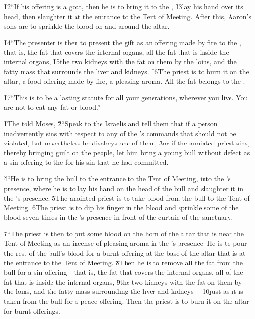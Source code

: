 \v{12}``If his offering is a goat, then he is to bring it to the , \v{13}lay his hand over its head, then slaughter it at the entrance to the Tent of Meeting. After this, Aaron's sons are to sprinkle the blood on and around the altar.

\v{14}``The presenter is then to present the gift as an offering made by fire to the , that is, the fat that covers the internal organs, all the fat that is inside the internal organs, \v{15}the two kidneys with the fat on them by the loins, and the fatty mass that surrounds the liver and kidneys. \v{16}The priest is to burn it on the altar, a food offering made by fire, a pleasing aroma. All the fat belongs to the .

\v{17}``This is to be a lasting statute for all your generations, wherever you live. You are not to eat any fat or blood.''

\v{1}The  told Moses, \v{2}``Speak to the Israelis and tell them that if a person inadvertently sins with respect to any of the 's commands that should not be violated, but nevertheless he disobeys one of them, \v{3}or if the anointed priest sins, thereby bringing guilt on the people, let him bring a young bull without defect as a sin offering to the  for his sin that he had committed.

\v{4}``He is to bring the bull to the entrance to the Tent of Meeting, into the 's presence, where he is to lay his hand on the head of the bull and slaughter it in the 's presence. \v{5}The anointed priest is to take blood from the bull to the Tent of Meeting. \v{6}The priest is to dip his finger in the blood and sprinkle some of the blood seven times in the 's presence in front of the curtain of the sanctuary.

\v{7}``The priest is then to put some blood on the horn of the altar that is near the Tent of Meeting as an incense of pleasing aroma in the 's presence. He is to pour the rest of the bull's blood for a burnt offering at the base of the altar that is at the entrance to the Tent of Meeting. \v{8}Then he is to remove all the fat from the bull for a sin offering---that is, the fat that covers the internal organs, all of the fat that is inside the internal organs, \v{9}the two kidneys with the fat on them by the loins, and the fatty mass surrounding the liver and kidneys--- \v{10}just as it is taken from the bull for a peace offering. Then the priest is to burn it on the altar for burnt offerings.

